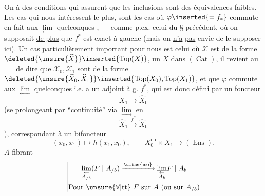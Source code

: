 On  à des conditions  qui assurent que les  inclusions
sont des équivalences faibles. Les cas qui nous intéressent le plus, sont les cas où $\varphi\inserted{=f_*}$ commute en fait aux $\underset{\leftarrow}{\lim}$ quelconques , --- comme p.ex. celui du § précédent, où on supposait \uline{de plus} que $f^*$ est exact à gauche (mais on \uline{n'a} \uline{pas} envie de le supposer ici). Un cas particulièrement important pour nous est celui où $\mathcal X$ est de la forme $\deleted{\unsure{\widehat X}}\inserted{\operatorname{Top}(X)}$, un $X$ dans $(\operatorname{Cat})$, il revient au $=$ de dire que
$\mathcal X_0,\mathcal X_1$ sont de la forme $\deleted{\unsure{\widehat X_0,\widehat X_1}}\inserted{\operatorname{Top}(X_0),\operatorname{Top}(X_1)}$, et que $\varphi$ commute aux $\underset{\leftarrow}{\lim}$ quelconques i.e. a un adjoint à g. $f^*$, qui est donc défini par un foncteur
\[
X_1\longrightarrow\widehat X_0
\]
(se prolongeant par ``continuité'' via $\underset{\longrightarrow}{\lim}$ en
\[
\widehat X_1\xrightarrow{f^*}\widehat X_0
\]
), correspondant à un bifoncteur
\[
(x_0,x_1)\longmapsto h(x_1,x_0),\qquad X_0^{\mathrm{op}}\times X_1\longrightarrow(\operatorname{Ens}).
\]
$A$ fibrant
\[
\left|\begin{gathered}
\underset{\substack{\leftarrow\\A_{/b}}}{\lim}(F\mid A_{/b})\xrightarrow{\uline{\mathrm{iso}}}\underset{\substack{\leftarrow\\A_b}}{\lim}F\mid A_b\\
\text{Pour }\unsure{\forall|\mathrm{tt}}\ F\text{ sur }A\text{ (ou sur }A_{/b}\text{)}
\end{gathered}\right.
\]
